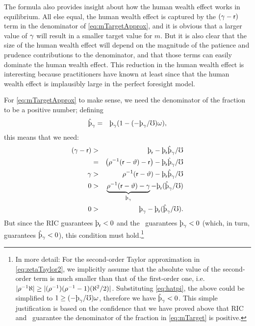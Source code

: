 \documentclass{handout}
\begin{document}
The formula also provides insight about how the human wealth effect
works in equilibrium.  All else equal, the human wealth effect is captured
by the $(\gamma-\mathsf{r})$ term in the denominator of \eqref{eq:mTargetApprox},
and it is obvious that a larger value of $\gamma$ will result in a smaller
target value for $m$.  But it is also clear that the size of the human wealth
effect will depend on the magnitude of the patience and prudence contributions
to the denominator, and that those terms can easily dominate the human wealth
effect.  This reduction in the human wealth effect is interesting because practitioners have known at least since
\cite{summersCapTax} that the human wealth effect is implausibly large in the
perfect foresight model.

For \eqref{eq:mTargetApprox} to make sense, we need
the denominator of the fraction to be a positive number;
defining
\begin{eqnarray}
  \patpGrohat & = & \patpGro(1-(-\patpGro/\urate)\prudEx),
\end{eqnarray}
this means that we need:
\begin{eqnarray}
    (\pGro - \rfree) & > & \patr - \patr\patpGrohat/\urate
\\   & = & \left(\CRRA^{-1}(\rfree-\timeRate)-\rfree\right)-  \patr\patpGrohat/\urate
\\ \pGro & > & \CRRA^{-1}(\rfree-\timeRate)-  \patr\patpGrohat/\urate
\\ 0 & > & \underbrace{\CRRA^{-1}(\rfree-\timeRate) - \pGro}_{\patpGro} -  \patr(\patpGrohat/\urate)
\\ 0 & > & \patpGro -  \patr(\patpGrohat/\urate) \label{eq:newDenom}
.
\end{eqnarray}
But since the RIC guarantees $\patr<0$ and the \GICPGro~guarantees $\patpGro<0$ (which, in turn, guarantees $\patpGrohat < 0$), this condition must hold.\footnote{In more detail: For the second-order Taylor approximation in \eqref{eq:zetaTaylor2}, we implicitly assume that the absolute value of the second-order term is much smaller than that of the first-order one, i.e. $|\rho^{-1} \aleph | \geq |(\rho^{-1})(\rho^{-1}-1)(\aleph^{2}/2)|$. Substituting \eqref{eq:hatpi}, the above could be simplified to $1 \geq (-\patpGro/\urate)\prudEx$, therefore we have $\patpGrohat < 0$. This simple justification is based on the confidence that we have proved above that RIC and \GICPGro~guarantee the denominator of the fraction in \eqref{eq:mTarget} is positive.}
\end{document}
